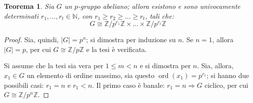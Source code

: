 \documentclass[12pt]{scrartcl}
\theoremstyle{style}
\newtheorem{teorema}{Teorema}[section]
\numberwithin{equation}{subsection}
\begin{document}
\begin{teorema}\label{corts2}
	Sia $G$ un $p$-gruppo abeliano; allora esistono e sono univocamente determinati $r_1,\ldots,r_t \in \mathbb{N}$, con $r_1\ge r_2\ge \ldots\ge r_t$, tali che:
	\[
	G \cong \mathbb{Z}/p^{r_1}\mathbb{Z} \times  \ldots \times \mathbb{Z} / p^{r_t}\mathbb{Z}
	\] 
\end{teorema}
	\begin{proof}
		Sia, quindi, $\lvert G \rvert =p^{n}$; si dimostra per induzione su $n$.
		Se $n=1$, allora $\lvert G \rvert = p$, per cui $G \cong \mathbb{Z} / p\mathbb{Z}$ e la tesi \`e verificata.

		Si assume che la tesi sia vera per $1 \le m < n $ e si dimostra per $n$. 
		Sia, allora, $x_1 \in G$ un elemento di ordine massimo, sia questo $\operatorname{ord}(x_1) =p^{r_1} $; si hanno due possibili casi: $r_1 = n$ e $r_1<n$.
		Il primo caso \`e banale: $r_1=n \Rightarrow G$ ciclico, per cui $G \cong \mathbb{Z}/p^n\mathbb{Z}$.


\end{proof}
\end{document}
